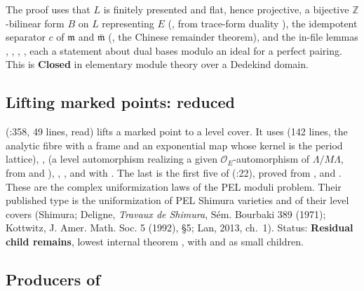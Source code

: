 \documentclass[11pt]{article}
\newcommand{\sC}{\textbf{Closed}}
\newcommand{\sR}{\textbf{Residual child remains}}
\theoremstyle{remark}
\begin{document}
The proof uses that $L$ is finitely presented and flat, hence projective, a bijective $\mathbb Z$-bilinear form $B$ on $L$ representing $E$ (, from trace-form duality ), the idempotent separator $c$ of $\mathfrak m$ and $\bar{\mathfrak m}$ (, the Chinese remainder theorem), and the in-file lemmas , , , , each a statement about dual bases modulo an ideal for a perfect pairing. This is \sC{} in elementary module theory over a Dedekind domain.

\subsection{Lifting marked points: reduced}

 (:358, 49 lines, read) lifts a marked point to a level cover. It uses  (142 lines, the analytic fibre with a frame and an exponential map whose kernel is the period lattice), ,  (a level automorphism realizing a given $\mathcal O_E$-automorphism of $\Lambda/M\Lambda$, from  and ), , , and  with . The last is the first five of  (:22), proved from ,  and . These are the complex uniformization laws of the PEL moduli problem. Their published type is the uniformization of PEL Shimura varieties and of their level covers (Shimura; Deligne, \emph{Travaux de Shimura}, S\'em. Bourbaki 389 (1971); Kottwitz, J. Amer. Math. Soc. 5 (1992), \S5; Lan, 2013, ch.~1). Status: \sR, lowest internal theorem , with  and  as small children.

\subsection{Producers of }
\end{document}
